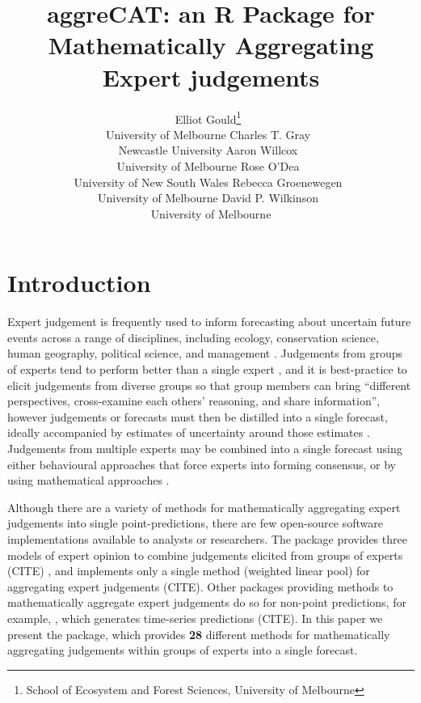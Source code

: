 \documentclass[article]{jss}
\author{Elliot
Gould\footnote{School of Ecosystem and Forest Sciences, University of
  Melbourne}~\orcidlink{0000-0002-6585-538X}\\University of
Melbourne \And Charles T.
Gray~\orcidlink{00000-0002-9978-011X}\\Newcastle University \AND Aaron
Willcox~\orcidlink{https://orcid.org/0000-0003-2536-2596}\\University of
Melbourne \And Rose O'Dea~\orcidlink{0000-0001-8177-5075}\\University of
New South Wales \AND Rebecca
Groenewegen~\orcidlink{https://orcid.org/0000-0001-9177-8536}\\University
of Melbourne \And David P.
Wilkinson~\orcidlink{0000-0002-9560-6499}\\University of Melbourne}
\title{aggreCAT: an R Package for Mathematically Aggregating Expert
judgements}
\begin{document}
\maketitle
\ifdefined\Shaded\renewenvironment{Shaded}{\begin{tcolorbox}[frame hidden, interior hidden, enhanced, breakable, sharp corners, boxrule=0pt, borderline west={3pt}{0pt}{shadecolor}]}{\end{tcolorbox}}\fi

\hypertarget{sec-introduction}{%
\section{Introduction}\label{sec-introduction}}

Expert judgement is frequently used to inform forecasting about
uncertain future events across a range of disciplines, including
ecology, conservation science, human geography, political science, and
management \citep{Sutherland2018}. Judgements from groups of experts
tend to perform better than a single expert \citep{Goossens2008}, and it
is best-practice to elicit judgements from diverse groups so that group
members can bring ``different perspectives, cross-examine each others'
reasoning, and share information'', however judgements or forecasts must
then be distilled into a single forecast, ideally accompanied by
estimates of uncertainty around those estimates \citep{Hanea2021}.
Judgements from multiple experts may be combined into a single forecast
using either behavioural approaches that force experts into forming
consensus, or by using mathematical approaches \citep{Goossens2008}.

Although there are a variety of methods for mathematically aggregating
expert judgements into single point-predictions, there are few
open-source software implementations available to analysts or
researchers. The  \citet{R} package  provides
three models of expert opinion to combine judgements elicited from
groups of experts (CITE) , and  implements only a single
method (weighted linear pool) for aggregating expert judgements (CITE).
Other  packages providing methods to mathematically
aggregate expert judgements do so for non-point predictions, for
example, , which generates time-series predictions (CITE). In
this paper we present the  package, which provides
\textbf{28} different methods for mathematically aggregating judgements
within groups of experts into a single forecast.
\end{document}
